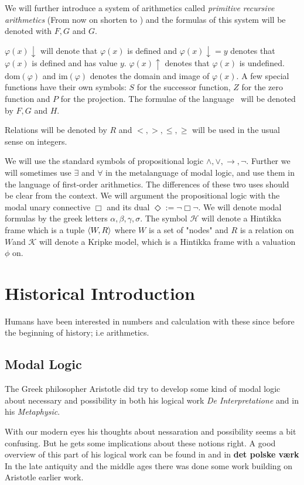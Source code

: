 \documentclass[../main.tex]{subfiles}
\begin{document}
We will further introduce a system of arithmetics called \textit{primitive
recursive arithmetics} (From now on shorten to \PRA) and the formulas of this
system will be denoted with $F,G$ and $G$.

$\varphi(x)\downarrow$ will denote that $\varphi(x)$ is defined and
$\varphi(x)\downarrow=y$ denotes that $\varphi(x)$ is defined and has value $y$.
$\varphi(x)\uparrow$
denotes that $\varphi(x)$ is undefined. $\text{dom}(\varphi)$ and $\text{im}
(\varphi)$ denotes the
domain and image of $\varphi(x)$.
A few special functions have their own symbols: $S$ for the
successor function, $Z$ for the zero function and $P$ for the projection.
The formulae of the language \PRA\ will be denoted by $F,G$ and $H$.

Relations will be denoted by $R$ and $<,>,\leq,\geq$ will be used in the usual
sense on integers.

We will use the standard symbols of propositional  logic
$\wedge,\vee,\rightarrow,\neg$. Further we will sometimes use $\exists$ and
$\forall$ in the metalanguage of modal logic, and use them in the language of
first-order arithmetics. The differences of these two uses should be clear
from the context. We will argument the propositional logic with the modal unary
connective $\Box$ and its dual $\Diamond:=\neg\Box\neg$. We will denote modal
formulas by the greek letters $\alpha,\beta,\gamma,\sigma$. The symbol
$\mathcal{H}$ will denote a
Hintikka frame  which is a tuple $\langle W,R\rangle$ where $W$ is a set of "nodes" and
$R$ is a relation on $W$and
$\mathcal{K}$ will denote a Kripke model, which is a Hintikka frame with a
valuation $\phi$ on.

\section{Historical Introduction}
Humans have been interested in numbers and calculation with these since before
the beginning of history; i.e arithmetics. 

\subsection{Modal Logic}
The Greek philosopher Aristotle did try to develop some kind of modal logic
about necessary and possibility in both his logical work \textit{De
Interpretatione} and in his
 \textit{Metaphysic}.

With our modern eyes his thoughts about nessaration and possibility seems a
bit confusing. But he gets some implications about these notions right. A good
overview of this part of his logical work can be found in \cite{Lemmon1977} and
in \textbf{det polske værk}
In the late antiquity and the middle ages there was done some work building on 
Aristotle earlier work. 
\end{document}
